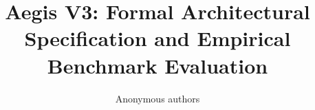 \title{\textbf{Aegis V3: Formal Architectural Specification and Empirical Benchmark Evaluation}}

\author{Anonymous authors}
